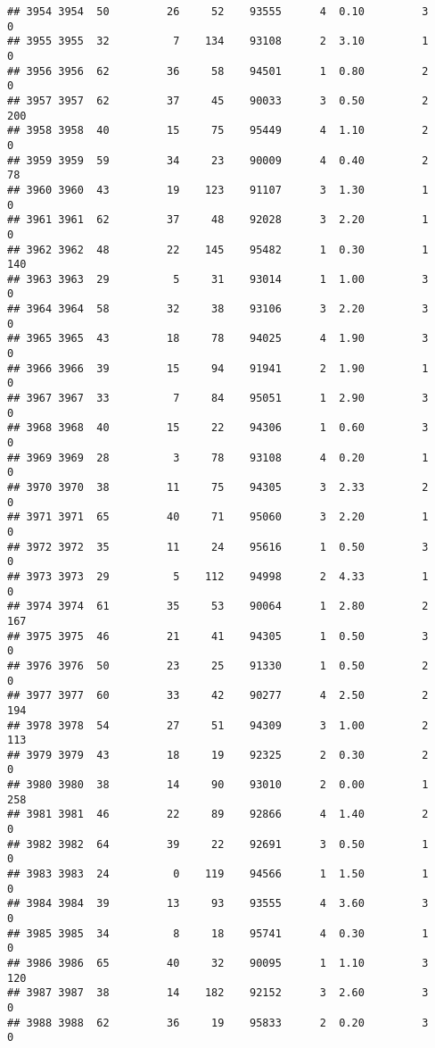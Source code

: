 \documentclass[
]{article}
\begin{document}
\begin{verbatim}
## 3954 3954  50         26     52    93555      4  0.10         3        0
## 3955 3955  32          7    134    93108      2  3.10         1        0
## 3956 3956  62         36     58    94501      1  0.80         2        0
## 3957 3957  62         37     45    90033      3  0.50         2      200
## 3958 3958  40         15     75    95449      4  1.10         2        0
## 3959 3959  59         34     23    90009      4  0.40         2       78
## 3960 3960  43         19    123    91107      3  1.30         1        0
## 3961 3961  62         37     48    92028      3  2.20         1        0
## 3962 3962  48         22    145    95482      1  0.30         1      140
## 3963 3963  29          5     31    93014      1  1.00         3        0
## 3964 3964  58         32     38    93106      3  2.20         3        0
## 3965 3965  43         18     78    94025      4  1.90         3        0
## 3966 3966  39         15     94    91941      2  1.90         1        0
## 3967 3967  33          7     84    95051      1  2.90         3        0
## 3968 3968  40         15     22    94306      1  0.60         3        0
## 3969 3969  28          3     78    93108      4  0.20         1        0
## 3970 3970  38         11     75    94305      3  2.33         2        0
## 3971 3971  65         40     71    95060      3  2.20         1        0
## 3972 3972  35         11     24    95616      1  0.50         3        0
## 3973 3973  29          5    112    94998      2  4.33         1        0
## 3974 3974  61         35     53    90064      1  2.80         2      167
## 3975 3975  46         21     41    94305      1  0.50         3        0
## 3976 3976  50         23     25    91330      1  0.50         2        0
## 3977 3977  60         33     42    90277      4  2.50         2      194
## 3978 3978  54         27     51    94309      3  1.00         2      113
## 3979 3979  43         18     19    92325      2  0.30         2        0
## 3980 3980  38         14     90    93010      2  0.00         1      258
## 3981 3981  46         22     89    92866      4  1.40         2        0
## 3982 3982  64         39     22    92691      3  0.50         1        0
## 3983 3983  24          0    119    94566      1  1.50         1        0
## 3984 3984  39         13     93    93555      4  3.60         3        0
## 3985 3985  34          8     18    95741      4  0.30         1        0
## 3986 3986  65         40     32    90095      1  1.10         3      120
## 3987 3987  38         14    182    92152      3  2.60         3        0
## 3988 3988  62         36     19    95833      2  0.20         3        0

\end{verbatim}
\end{document}
